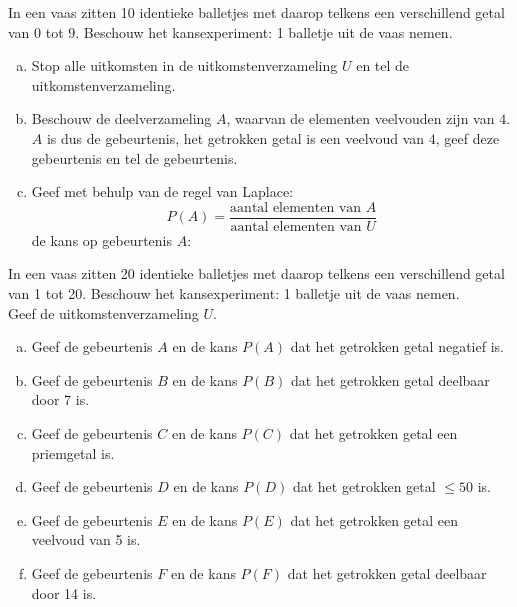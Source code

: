 \documentclass[12pt,twoside]{article}
\begin{document}
\begin{oefening}
In een vaas zitten 10 identieke balletjes met daarop telkens een verschillend getal van 0 tot 9. Beschouw het kansexperiment: 1 balletje uit de vaas nemen.
\begin{enumerate}[(a)]
  \item Stop alle uitkomsten in de uitkomstenverzameling $U$ en tel de uitkomstenverzameling.
  \item Beschouw de deelverzameling $A$, waarvan de elementen veelvouden zijn van $4$. $A$ is dus de gebeurtenis, het getrokken getal is een veelvoud van $4$, geef deze gebeurtenis en tel de gebeurtenis.
  \item Geef met behulp van de regel van Laplace:
  $$P(A)=\dfrac{\mbox{aantal elementen van }A}{\mbox{aantal elementen van }U}$$
  de kans op gebeurtenis $A$:
\end{enumerate}
\end{oefening}
\vspace*{0.5cm}

\begin{oefening}
In een vaas zitten 20 identieke balletjes met daarop telkens een verschillend getal van 1 tot 20. Beschouw het kansexperiment: 1 balletje uit de vaas nemen.\\
Geef de uitkomstenverzameling $U$.
\begin{enumerate}[(a)]
  \item Geef de gebeurtenis $A$ en de kans $P(A)$ dat het getrokken getal negatief is.
  \item Geef de gebeurtenis $B$ en de kans $P(B)$ dat het getrokken getal deelbaar door 7 is.
  \item Geef de gebeurtenis $C$ en de kans $P(C)$ dat het getrokken getal een priemgetal is.
  \item Geef de gebeurtenis $D$ en de kans $P(D)$ dat het getrokken getal $\leq 50$ is.
  \item Geef de gebeurtenis $E$ en de kans $P(E)$ dat het getrokken getal een veelvoud van 5 is.
  \item Geef de gebeurtenis $F$ en de kans $P(F)$ dat het getrokken getal deelbaar door 14 is.
\end{enumerate}
\end{oefening}
\end{document}
